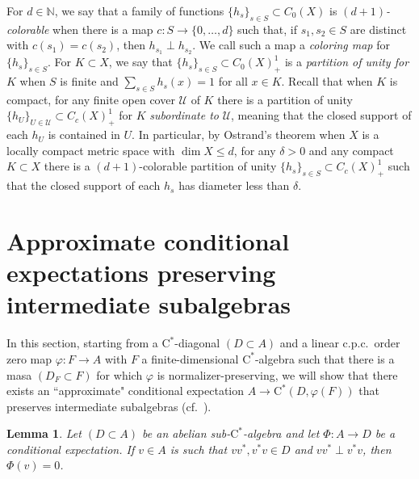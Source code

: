 \documentclass[11pt,a4paper]{amsart}
\newtheorem{lemma}[theorem]{Lemma}
\theoremstyle{definition}
\numberwithin{equation}{section}
\newcommand{\mc}[1]{\mathcal{#1}}
\newcommand{\bb}[1]{\mathbb{#1}}
\begin{document}
For $d\in\bb{N}$, we say that a family of functions $\{h_s\}_{s\in S}\subset C_0(X)$ is $(d+1)$\emph{-colorable} when there is a map $c\colon S\to \{0,\dots,d\}$ such that, if $s_1,s_2\in S$ are distinct with $c(s_1)=c(s_2)$, then $h_{s_1}\perp h_{s_2}$. We call such a map a \emph{coloring map} for $\{h_s\}_{s\in S}$. For $K\subset X$, we say that $\{h_s\}_{s\in S}\subset C_0(X)_+^1$ is a \emph{partition of unity for} $K$ when $S$ is finite and $\sum_{s\in S}h_s(x)=1$ for all $x\in K$. Recall that when $K$ is compact, for any finite open cover $\mc{U}$ of $K$ there is a partition of unity $\{h_U\}_{U\in\mc{U}}\subset C_c(X)_+^1$ for $K$ \emph{subordinate to} $\mc{U}$, meaning that the closed support of each $h_U$ is contained in $U$. In particular, by Ostrand's theorem \cite[Theorem~3.2.4]{Engelking78} when $X$ is a locally compact metric space with $\dim X\le d$, for any $\delta>0$ and any compact $K\subset X$ there is a $(d+1)$-colorable partition of unity $\{h_s\}_{s\in S}\subset C_c(X)_+^1$ such that the closed support of each $h_s$ has diameter less than $\delta$.


\section{Approximate conditional expectations preserving intermediate subalgebras}



\noindent In this section, starting from a $\mathrm{C}^\ast$-diagonal $(D\subset A)$ and a linear c.p.c.\ order zero map $\varphi\colon F\to A$ with $F$ a finite-dimensional $\mathrm{C}^\ast$-algebra such that there is a masa $(D_F\subset F)$ for which $\varphi$ is normalizer-preserving, we will show that there exists an ``approximate" conditional expectation $A\to\mathrm{C}^\ast(D,\varphi(F))$ that preserves intermediate subalgebras (cf.\ ).



\begin{lemma}\label{lem:orthogonal-range-support-0exp}
Let $(D\subset A)$ be an abelian sub-$\mathrm{C}^\ast$-algebra and let $\Phi\colon A\to D$ be a conditional expectation. If $v\in A$ is such that $vv^*, v^*v\in D$ and $vv^*\perp v^*v$, then $\Phi(v)=0$.
\end{lemma}
\end{document}
